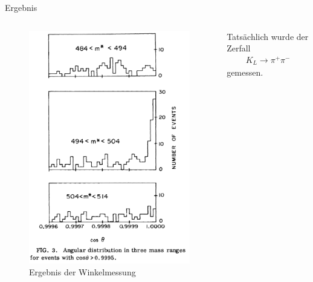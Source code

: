 \documentclass[aspectratio=1610, professionalfonts, 9pt, t]{beamer}
\begin{document}
  \begin{frame}{Ergebnis}
    \begin{columns}[onlytextwidth]
      \begin{column}{0.4\textwidth}
        \begin{figure}[ht]
          \begin{center}
            \includegraphics[height=0.8\textheight]{Images/croninfitch_erg.png}
            \caption{Ergebnis der Winkelmessung}
          \end{center}
        \end{figure}
      \end{column}
      \begin{column}{0.5\textwidth}
        \newline
        \newline
        \newline
        \newline
        Tatsächlich wurde der Zerfall
        \begin{align*}
          K_{L} \rightarrow \pi^{+} \pi^{-}
        \end{align*}
        gemessen.
      \end{column}
    \end{columns}
  \end{frame}
\end{document}
